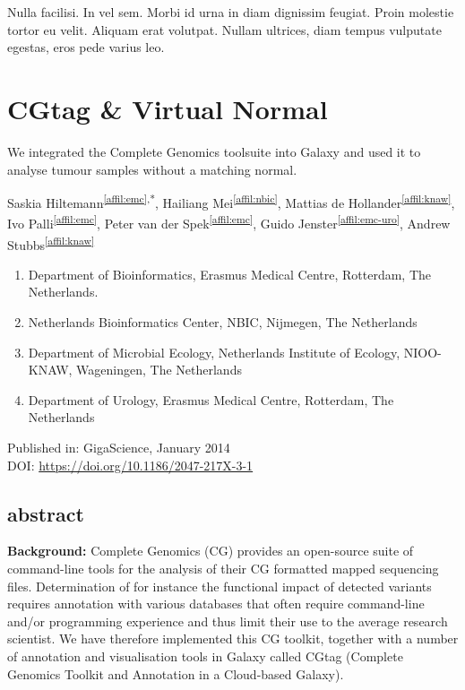 \begin{savequote}[75mm]
Nulla facilisi. In vel sem. Morbi id urna in diam dignissim feugiat. Proin molestie tortor eu velit. Aliquam erat volutpat. Nullam ultrices, diam tempus vulputate egestas, eros pede varius leo.
\end{savequote}

\chapter{CGtag \& Virtual Normal}
\setcounter{figure}{-1}
\setcounter{table}{-1}
\setcounter{section}{-1}

We integrated the Complete Genomics toolsuite into Galaxy and used it to analyse tumour samples without a matching normal.


\newpage
{}
Saskia Hiltemann\textsuperscript{\ref{affil:emc},*},
Hailiang Mei\textsuperscript{\ref{affil:nbic}},
Mattias de Hollander\textsuperscript{\ref{affil:knaw}},
Ivo Palli\textsuperscript{\ref{affil:emc}},
Peter van der Spek\textsuperscript{\ref{affil:emc}},
Guido Jenster\textsuperscript{\ref{affil:emc-uro}},
Andrew Stubbs\textsuperscript{\ref{affil:knaw}}

\small
\begin{enumerate}
\itemsep-0.5em
\item Department of Bioinformatics, Erasmus Medical Centre, Rotterdam, The Netherlands. \label{affil:emc}
\item Netherlands Bioinformatics Center, NBIC, Nijmegen, The Netherlands \label{affil:nbic}
\item Department of Microbial Ecology, Netherlands Institute of Ecology, NIOO-KNAW, Wageningen, The Netherlands \label{affil:knaw}
\item Department of Urology, Erasmus Medical Centre, Rotterdam,  The Netherlands \label{affil:emc-uro}
\end{enumerate}
\normalsize

Published in: GigaScience, January 2014 \\
DOI: \url{https://doi.org/10.1186/2047-217X-3-1}

\section*{abstract}

\textbf{Background:} Complete Genomics (CG) provides an open-source suite of command-line tools for the analysis of their CG formatted mapped sequencing files.  Determination of for instance the functional impact of detected variants requires annotation with various databases that often require command-line and/or programming experience and thus limit their use to the average research scientist.  We have therefore implemented this CG toolkit, together with a number of annotation and visualisation tools in Galaxy called CGtag (Complete Genomics Toolkit and Annotation in a Cloud-based Galaxy).


